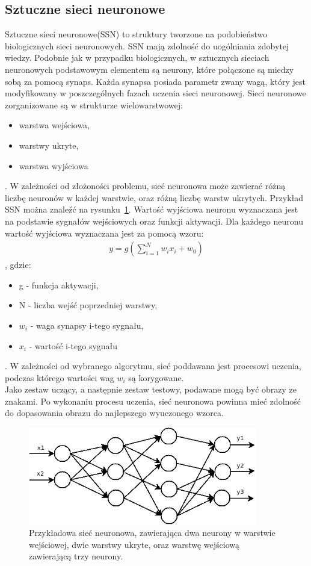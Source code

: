 \subsection{Sztuczne sieci neuronowe}
Sztuczne sieci neuronowe(SSN) to struktury tworzone na podobieństwo biologicznych sieci neuronowych. SSN mają zdolność do uogólniania zdobytej wiedzy. Podobnie jak w przypadku biologicznych, w sztucznych sieciach neuronowych podstawowym elementem są neurony, które połączone są miedzy sobą za pomocą synaps. Każda synapsa posiada parametr zwany wagą, który jest modyfikowany w poszczególnych fazach uczenia sieci neuronowej. Sieci neuronowe zorganizowane są w strukturze wielowarstwowej:
\begin{itemize}
  \item warstwa wejściowa,
  \item warstwy ukryte,
  \item warstwa wyjściowa
\end{itemize}. W zależności od złożoności problemu, sieć neuronowa może zawierać różną liczbę neuronów w każdej warstwie, oraz różną liczbę warstw ukrytych. Przykład SSN można znaleźć na rysunku~\ref{fig:ssn_example}. Wartość wyjściowa neuronu wyznaczana jest na podstawie sygnałów wejściowych oraz funkcji aktywacji. Dla każdego neuronu wartość wyjściowa wyznaczana jest za pomocą wzoru:
\begin{gather*}
  y = g(\sum_{i=1}^{N}w_ix_i+w_0)
\end{gather*}, gdzie:
\begin{itemize}
  \item g - funkcja aktywacji,
  \item N - liczba wejść poprzedniej warstwy,
  \item $w_i$ - waga synapsy i-tego sygnału,
  \item $x_i$ - wartość i-tego sygnału
\end{itemize}. W zależności od wybranego algorytmu, sieć poddawana jest procesowi uczenia, podczas którego wartości wag $w_i$ są korygowane.\\
Jako zestaw uczący, a następnie zestaw testowy, podawane mogą być obrazy ze znakami. Po wykonaniu procesu uczenia, sieć neuronowa powinna mieć zdolność do dopasowania obrazu do najlepszego wyuczonego wzorca. 
\begin{figure}
  \centering
  \includegraphics[width=10cm]{img/ssn-example}
  \caption{Przykładowa sieć neuronowa, zawierająca dwa neurony w warstwie wejściowej, dwie warstwy ukryte, oraz warstwę wejściową zawierającą trzy neurony.}
  \label{fig:ssn_example}
\end{figure}
